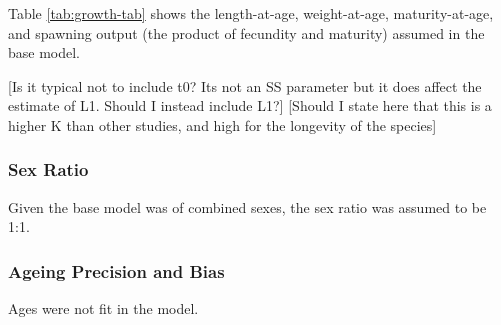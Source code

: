 \documentclass[11pt,
  english,
  a4paper,
]{article}
\begin{document}
\leavevmode\tagmcend\tagstructend\par


Table \ref{tab:growth-tab} shows the length-at-age, weight-at-age, maturity-at-age, and spawning output (the product of fecundity and maturity) assumed in the base model.

\leavevmode\tagmcend\tagstructend\par


{[}Is it typical not to include t0? Its not an SS parameter but it does affect the estimate of L1. Should I instead include L1?{]} {[}Should I state here that this is a higher K than other studies, and high for the longevity of the species{]}

\leavevmode\tagmcend\tagstructend\par


\hypertarget{sex-ratio}{%
\subsubsection{Sex Ratio}\label{sex-ratio}}

\leavevmode\tagmcend\tagstructend


Given the base model was of combined sexes, the sex ratio was assumed to be 1:1.

\leavevmode\tagmcend\tagstructend\par


\hypertarget{ageing-precision-and-bias}{%
\subsubsection{Ageing Precision and Bias}\label{ageing-precision-and-bias}}

\leavevmode\tagmcend\tagstructend


Ages were not fit in the model.

\leavevmode\tagmcend\tagstructend\par

\end{document}
